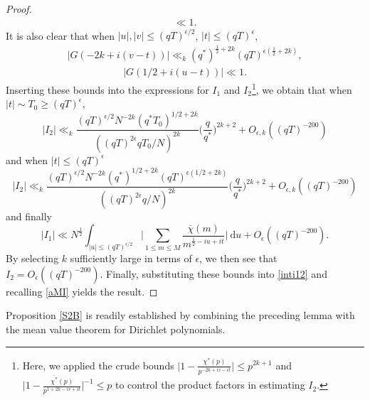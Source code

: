 \documentclass[12pt]{amsart}
\theoremstyle{definition}
\theoremstyle{plain}
\theoremstyle{remark}
\numberwithin{equation}{section}
\numberwithin{theorem}{section}
\numberwithin{equation}{section}
\begin{document}
\begin{proof}
\begin{align*}
			\ll 1.
		\end{align*}
		It is also clear that when $|u|, |v| \leq (qT)^{\epsilon/2}$, $|t| \leq (qT)^{\epsilon}$, 
		\begin{align*}
			|G(-2k+i(v-t))|\ll_{k}(q^{*})^{\frac{1}{2}+2k}(qT)^{\epsilon(\frac{1}{2}+2k)},
		\end{align*}
		\begin{align*}
			|G(1/2+i(u-t))|
			\ll 1.
		\end{align*}
		Inserting these bounds into the expressions for $I_{1}$ and $I_{2}$\footnote{Here, we applied the crude bounds  $\bigg|1-\frac{\chi^{*}(p)}{p^{-2k+iv-it}}\bigg| \leq p^{2k+1}$ and
			$\bigg|1-\frac{\overline{\chi^{*}}(p)}{p^{1+2k-iv+it}}\bigg|^{-1}\leq p$ to control the product factors in estimating $I_{2}$.}, we obtain that when $|t|\sim T_{0}\geq (qT)^{\epsilon}$,
		\[|I_{2}| \ll_{k} 
		\frac{(qT)^{\epsilon/2}N^{-2k}(q^{*}T_{0})^{1/2+2k}}{((qT)^{2\epsilon}qT_{0}/N)^{2k}}\bigg(\frac{q}{q^{*}}\bigg)^{2k+2}
		+O_{\epsilon, k}((qT)^{-200})\]
		and when $|t| \leq (qT)^{\epsilon}$
		\[|I_{2}| \ll_{k} 
		\frac{(qT)^{\epsilon/2}N^{-2k}(q^{*})^{1/2+2k}(qT)^{\epsilon(1/2+2k)}}{((qT)^{2\epsilon}q/N)^{2k}}\bigg(\frac{q}{q^{*}}\bigg)^{2k+2}
		+O_{\epsilon, k}((qT)^{-200})\]
		and finally
		\[|I_{1}| \ll N^{\frac{1}{2}} \int_{|u|\leq(qT)^{\epsilon/2}}\bigg|\sum_{1 \leq m \leq M}\frac{\overline{\chi}(m)}{m^{\frac{1}{2}-iu+it}}\bigg|\:\mathrm{d}u+O_{\epsilon}((qT)^{-200}).\]
		By selecting $k$ sufficiently large in terms of $\epsilon$, we then see that $I_{2}=O_{\epsilon}((qT)^{-200})$. Finally, substituting these bounds into \eqref{inti12} and recalling \eqref{aMI} yields the result.
	\end{proof}
	
	Proposition \ref{S2B} is readily established by combining the preceding lemma with the mean value theorem for Dirichlet polynomials.
	
\end{document}
